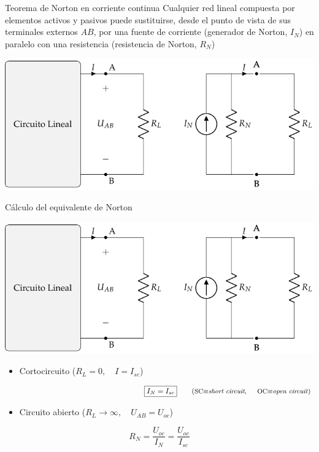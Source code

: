 \documentclass[aspectratio=169, xcolor={usenames,svgnames,dvipsnames}]{beamer}
\begin{document}

\begin{frame}{Teorema de Norton en corriente continua}
    Cualquier \alert{red lineal} compuesta por elementos activos y pasivos \alert{puede sustituirse}, desde el punto de vista de sus terminales externos $AB$, por una \alert{fuente de corriente} (generador de Norton, \(I_N\)) en \alert{paralelo} con una \alert{resistencia} (resistencia de Norton, \(R_N\))
    
    \begin{center}
        \includegraphics[height=0.6\textheight]{../figs/EquivalenteNorton_R.pdf}
    \end{center}
\end{frame}


\begin{frame}{Cálculo del equivalente de Norton}
    \begin{center}
    \includegraphics[height=0.43\textheight]{../figs/EquivalenteNorton_R.pdf}
    \end{center}
    
    \begin{itemize}
    \item Cortocircuito (\(R_L = 0, \quad I = I_{sc}\))
    \end{itemize}
    \[
    \hspace{65mm}
    \boxed{I_N = I_{sc}}
    \qquad \textrm{(\small{SC$\equiv$\textit{short circuit}, \hspace*{4mm}OC$\equiv$\textit{open circuit}})}
    \] 
    \vspace{-3mm}
    \begin{itemize}
    \item Circuito abierto (\(R_L \to \infty, \quad U_{AB} = U_{oc}\))
    \end{itemize}
    \[
    \boxed{R_N = \frac{U_{oc}}{I_N} = \frac{U_{oc}}{I_{sc}}}
    \]
\end{frame}
\end{document}

